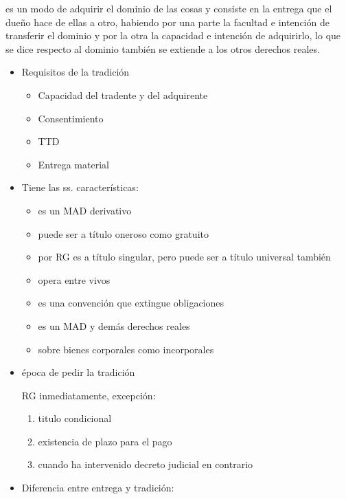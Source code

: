 \documentclass[]{article}
\providecommand{\tightlist}{%
  \setlength{\itemsep}{0pt}\setlength{\parskip}{0pt}}
\begin{document}
\begin{itemize}
\begin{itemize}
    es un modo de adquirir el dominio de las cosas y consiste en la
    entrega que el dueño hace de ellas a otro, habiendo por una parte la
    facultad e intención de transferir el dominio y por la otra la
    capacidad e intención de adquirirlo, lo que se dice respecto al
    dominio también se extiende a los otros derechos reales.

    \begin{itemize}
    \item
      Requisitos de la tradición

      \begin{itemize}
      \tightlist
      \item
        Capacidad del tradente y del adquirente
      \item
        Consentimiento
      \item
        TTD
      \item
        Entrega material
      \end{itemize}
    \item
      Tiene las ss. características:

      \begin{itemize}
      \tightlist
      \item
        es un MAD derivativo
      \item
        puede ser a título oneroso como gratuito
      \item
        por RG es a título singular, pero puede ser a título universal
        también
      \item
        opera entre vivos
      \item
        es una convención que extingue obligaciones
      \item
        es un MAD y demás derechos reales
      \item
        sobre bienes corporales como incorporales
      \end{itemize}
    \item
      época de pedir la tradición

      RG inmediatamente, excepción:

      \begin{enumerate}
      \def\labelenumi{\arabic{enumi}.}
      \tightlist
      \item
        titulo condicional
      \item
        existencia de plazo para el pago
      \item
        cuando ha intervenido decreto judicial en contrario
      \end{enumerate}
    \item
      Diferencia entre entrega y tradición:


\end{itemize}
\end{itemize}
\end{itemize}
\end{document}
